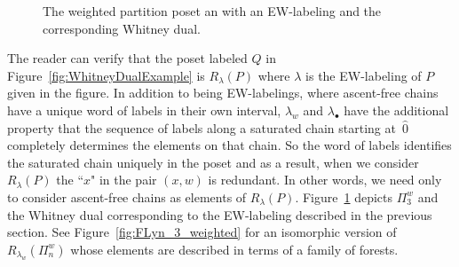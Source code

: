 \begin{figure}
{
}
\caption{The weighted partition poset an with an EW-labeling and  the corresponding Whitney dual.}
\label{fig:Pi3wAndWhitneyDual}
\end{figure}
The reader can verify that the poset labeled $Q$ in Figure~\ref{fig:WhitneyDualExample} is $R_\lambda(P)$ where $\lambda$ is the EW-labeling of $P$ given in the figure. In addition to being EW-labelings, where ascent-free chains have a unique word of labels in their own interval, $\lambda_w$ and $\lambda_\bullet$ have the additional property that the sequence of labels along a saturated chain starting at~$\hat{0}$ completely determines the elements on that chain. So the word of labels identifies the saturated chain uniquely in the poset and as a result, when we consider $R_\lambda(P)$ the ``$x$" in the pair $(x,w)$ is redundant. In other words, we need only to consider ascent-free chains as elements of $R_\lambda(P)$.  
Figure~\ref{fig:Pi3wAndWhitneyDual} depicts $\Pi_3^w$ and the Whitney dual corresponding to the EW-labeling described in the previous section. See Figure~\ref{fig:FLyn_3_weighted} for an isomorphic version of $R_{\lambda_w}(\Pi_n^w)$ whose elements are described in terms of a family of forests.


